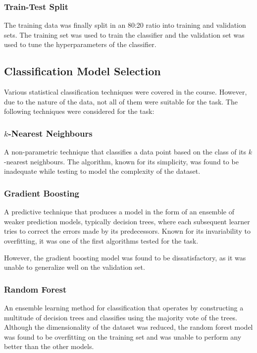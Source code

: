 \documentclass[conference]{IEEEtran}
\begin{document}
    \subsubsection{Train-Test Split}
    The training data was finally split in an 80:20 ratio into training and validation sets.
    The training set was used to train the classifier and the validation set was used to tune the hyperparameters of the classifier.

    \subsection{Classification Model Selection}
    \label{sec:modelselection}
    Various statistical classification techniques were covered in the course.
    However, due to the nature of the data, not all of them were suitable for the task.
    The following techniques were considered for the task:

    \subsubsection{$k$-Nearest Neighbours}
    \label{sec:knn}
    A non-parametric technique that classifies a data point based on the class of its $k$-nearest neighbours.
    The algorithm, known for its simplicity, was found to be inadequate while testing to model the complexity of the dataset.

    \subsubsection{Gradient Boosting}
    \label{sec:gb}
    A predictive technique that produces a model in the form of an ensemble of weaker prediction models, typically decision trees,
    where each subsequent learner tries to correct the errors made by its predecessors.
    Known for its invariability to overfitting, it was one of the first algorithms tested for the task.

    However, the gradient boosting model was found to be dissatisfactory, as it was unable to generalize well on the validation set.

    \subsubsection{Random Forest}
    \label{sec:rf}
    An ensemble learning method for classification that operates by constructing a multitude of decision trees
    and classifies using the majority vote of the trees.
    Although the dimensionality of the dataset was reduced, the random forest model was found to be overfitting on
    the training set and was unable to perform any better than the other models.
\end{document}
